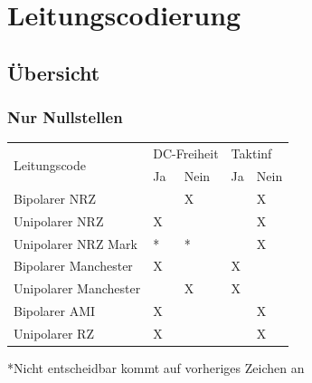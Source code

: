 
\section{Leitungscodierung}

\subsection{Übersicht}
\subsubsection{Nur Nullstellen}
    \begin{tabular}{|l|l|l|l|l|}
        \hline
        \multirow{2}{*}{Leitungscode} & \multicolumn{2}{l|}{DC-Freiheit} & \multicolumn{2}{l|}{Taktinf} \\ \cline{2-5}
        & Ja             & Nein            & Ja               & Nein              \\ \hline
        Bipolarer NRZ            &                & X               &                  & X                 \\ \hline
        Unipolarer NRZ           & X               &                &                 &  X                 \\ \hline
        Unipolarer NRZ Mark      & *              &  *               &                 &  X                 \\ \hline
        Bipolarer Manchester     & X              &                 & X                &                   \\ \hline
        Unipolarer Manchester    &               &  X               & X                &                   \\ \hline
        Bipolarer AMI            & X              &                 &                 &  X                 \\ \hline
        Unipolarer RZ			 &	X			  & 			   & 				&	X				\\ \hline
    \end{tabular}
*Nicht entscheidbar kommt auf vorheriges Zeichen an

